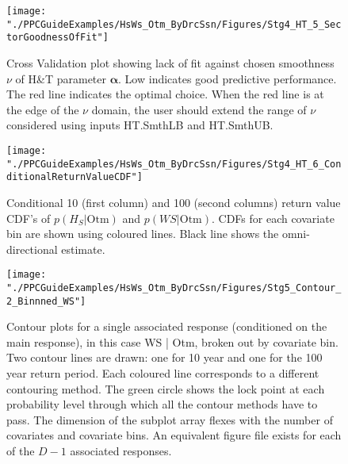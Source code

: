 \begin{figure}
	\centering
	\texttt{[image: "./PPCGuideExamples/HsWs\_Otm\_ByDrcSsn/Figures/Stg4\_HT\_5\_SectorGoodnessOfFit"]}
	\caption{Cross Validation plot showing lack of fit against chosen smoothness $\nu$ of H\&T parameter $\boldsymbol{\alpha}$. Low indicates good predictive performance. The red line indicates the optimal choice. When the red line is at the edge of the $\nu$ domain, the user should extend the range of $\nu$ considered using inputs HT.SmthLB and HT.SmthUB.}
	\label{fig:Ex_Stg4e}
\end{figure}

\begin{figure}
	\centering
	\texttt{[image: "./PPCGuideExamples/HsWs\_Otm\_ByDrcSsn/Figures/Stg4\_HT\_6\_ConditionalReturnValueCDF"]}
	\caption{Conditional 10 (first column) and 100 (second columns) return value CDF's of $p(H_S| \textrm{Otm})$ and  $p(WS | \textrm{Otm})$. CDFs for each covariate bin are shown using coloured lines. Black line shows the omni-directional estimate.}
	\label{fig:Ex_Stg4f}
\end{figure}

\begin{figure}
	\centering
	\texttt{[image: "./PPCGuideExamples/HsWs\_Otm\_ByDrcSsn/Figures/Stg5\_Contour\_2\_Binnned\_WS"]}
	\caption{Contour plots for a single associated response (conditioned on the main response), in this case WS | Otm, broken out by covariate bin. Two contour lines are drawn: one for 10 year and one for the 100 year return period. Each coloured line corresponds to a different contouring method. The green circle shows the lock point at each probability level through which all the contour methods have to pass. The dimension of the subplot array flexes with the number of covariates and covariate bins. An equivalent figure file exists for each of the $D-1$ associated responses. }
	\label{fig:Ex_Stg5}
\end{figure}

\newpage
